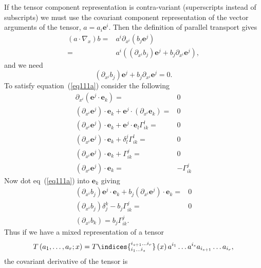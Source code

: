 \documentclass[12pt]{report}
\newcommand{\bm}[1]{\boldsymbol{#1}}
\newcommand{\lp}{\left (}
\newcommand{\rp}{\right )}
\newcommand{\f}[2]{{#1}\lp {#2} \rp}
\newcommand{\paren}[1]{\lp {#1} \rp}
\newcommand{\be}{\begin{equation}}
\newcommand{\ee}{\end{equation}}
\newcommand{\eb}{\bm{e}}
\begin{document}
If the tensor component representation is contra-variant (superscripts instead of subscripts) we must use the covariant component representation of
the vector arguments of the tensor, $a = a_{i}\eb^{i}$.  Then the definition of parallel transport gives
\begin{align}
    \paren{a\cdot\nabla_{x}}b =& a^{i}\partial_{x^{i}}\paren{b_{j}\eb^{j}} \nonumber \\
                              =& a^{i}\paren{\paren{\partial_{x^{i}}b_{j}}\eb^{j} + b_{j}\partial_{x^{i}}\eb^{j}},
\end{align}
and we need
\be
    \paren{\partial_{x^{i}}b_{j}}\eb^{j} + b_{j}\partial_{x^{i}}\eb^{j} = 0. \label{eq111a}
\ee
To satisfy equation~(\ref{eq111a}) consider the following
\begin{align}
    \partial_{x^{i}}\paren{\eb^{j}\cdot\eb_{k}} =& 0 \nonumber \\
    \paren{\partial_{x^{i}}\eb^{j}}\cdot\eb_{k} + \eb^{j}\cdot\paren{\partial_{x^{i}}\eb_{k}} =& 0  \nonumber \\
    \paren{\partial_{x^{i}}\eb^{j}}\cdot\eb_{k} + \eb^{j}\cdot\eb_{l}\Gamma_{ik}^{l} =& 0 \nonumber \\
    \paren{\partial_{x^{i}}\eb^{j}}\cdot\eb_{k} + \delta_{l}^{j}\Gamma_{ik}^{l} =& 0 \nonumber \\
    \paren{\partial_{x^{i}}\eb^{j}}\cdot\eb_{k} + \Gamma_{ik}^{j} =& 0 \nonumber \\
    \paren{\partial_{x^{i}}\eb^{j}}\cdot\eb_{k} =& -\Gamma_{ik}^{j}
\end{align}
Now dot eq~(\ref{eq111a}) into $\eb_{k}$ giving
\begin{align}
    \paren{\partial_{x^{i}}b_{j}}\eb^{j}\cdot\eb_{k} + b_{j}\paren{\partial_{x^{i}}\eb^{j}}\cdot\eb_{k} =& 0  \nonumber \\
    \paren{\partial_{x^{i}}b_{j}}\delta_{j}^{k} - b_{j}\Gamma_{ik}^{j} =& 0 \nonumber \\
    \paren{\partial_{x^{i}}b_{k}} = b_{j}\Gamma_{ik}^{j}.
\end{align}
Thus if we have a mixed representation of a tensor
\be
\f{T}{a_{1},\dots,a_{r};x} =
    \f{T\indices{_{i_{1}\dots i_{s}}^{i_{s+1}\dots i_{r}}}}{x}a^{i_{1}}\dots a^{i_{s}}a_{i_{s+1}}\dots a_{i_{r}},
\ee
the covariant derivative of the tensor is
\end{document}
